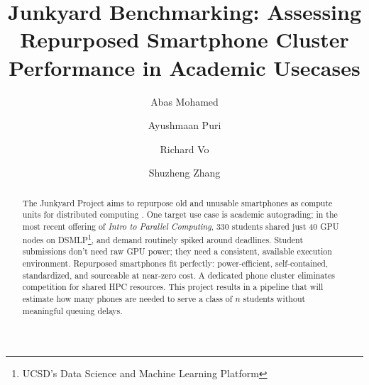 \documentclass[acmlarge]{acmart}
\begin{document}
\title{Junkyard Benchmarking: Assessing Repurposed Smartphone Cluster Performance in Academic Usecases}

\author{Abas Mohamed}

\author{Ayushmaan Puri}
\authornotemark[1]

\author{Richard Vo}
\authornotemark[1]

\author{Shuzheng Zhang}
\authornotemark[1]



\begin{abstract}

The Junkyard Project \cite{10.1145/3575693.3575710} aims to repurpose old and unusable smartphones as compute units for distributed computing \cite{switzer2025hardware}. One target use case is academic autograding; in the most recent offering of \textit{Intro to Parallel Computing}, 330 students shared just 40 GPU nodes on DSMLP\footnote{UCSD's Data Science and Machine Learning Platform}, and demand routinely spiked around deadlines. Student submissions don't need raw GPU power; they need a consistent, available execution environment. Repurposed smartphones fit perfectly: power-efficient, self-contained, standardized, and sourceable at near-zero cost. A dedicated phone cluster eliminates competition for shared HPC resources. This project results in a pipeline that will estimate how many phones are needed to serve a class of $n$ students without meaningful queuing delays.

\end{abstract}
\end{document}
